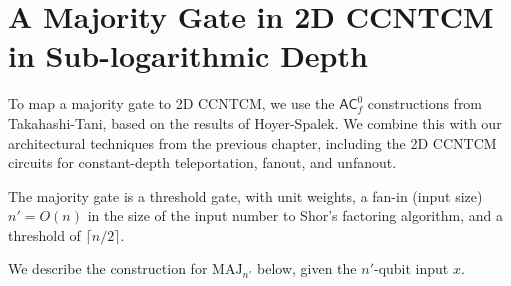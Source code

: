 \section{A Majority Gate in 2D CCNTCM in Sub-logarithmic Depth}

To map a majority gate to 2D CCNTCM, we use the $\textsf{AC}_f^0$ 
constructions from Takahashi-Tani, based on the results of
Hoyer-Spalek. We combine this with our architectural techniques
from the previous chapter, including the 2D CCNTCM circuits
for constant-depth teleportation, fanout, and unfanout.

The majority gate is a threshold gate, with unit weights, a
fan-in (input size) $n' = O(n)$ in the size of the input number to Shor's 
factoring algorithm, and a threshold of $\lceil n/2 \rceil$.

We describe the construction for $\text{MAJ}_{n'}$ below, given the
$n'$-qubit input $x$.

